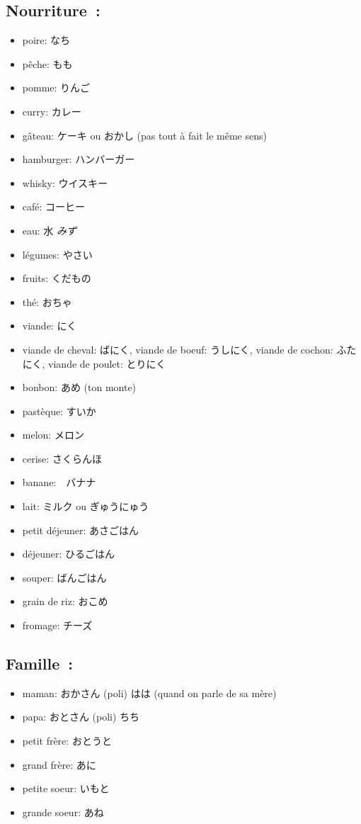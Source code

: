 \documentclass{article}
\begin{document}
\begin{CJK}{UTF8}{min}
   \subsection{Nourriture~:}
   \begin{itemize}
       \item poire: なち
        \item pêche: もも
        \item pomme: りんご
        \item curry: カレー
        \item gâteau: ケーキ ou おかし (pas tout à fait le même sens)
        \item hamburger: ハンバーガー    
        \item whisky: ウイスキー
        \item café: コーヒー
        \item eau: 水 \textit{みず}
        \item légumes: やさい
        \item fruits: くだもの
        \item thé: おちゃ
        \item viande: にく
        \item viande de cheval: ばにく, viande de boeuf: うしにく, viande de cochon: ふたにく, viande de poulet: とりにく
        \item bonbon: あめ (ton monte)
        \item pastèque: すいか
        \item melon: メロン
        \item cerise: さくらんほ
        \item banane:　バナナ
        \item lait: ミルク ou ぎゅうにゅう
        \item petit déjeuner: あさごはん
        \item déjeuner: ひるごはん
        \item souper: ばんごはん
        \item grain de riz: おこめ
        \item fromage: チーズ
   \end{itemize}
   \subsection{Famille~:}
   \begin{itemize}
       \item maman: おかさん (poli) はは (quand on parle de sa mère) 
       \item papa: おとさん (poli) ちち
        \item petit frère: おとうと
        \item grand frère: あに
        \item petite soeur: いもと
        \item grande soeur: あね
   \end{itemize}


\end{CJK}
\end{document}
